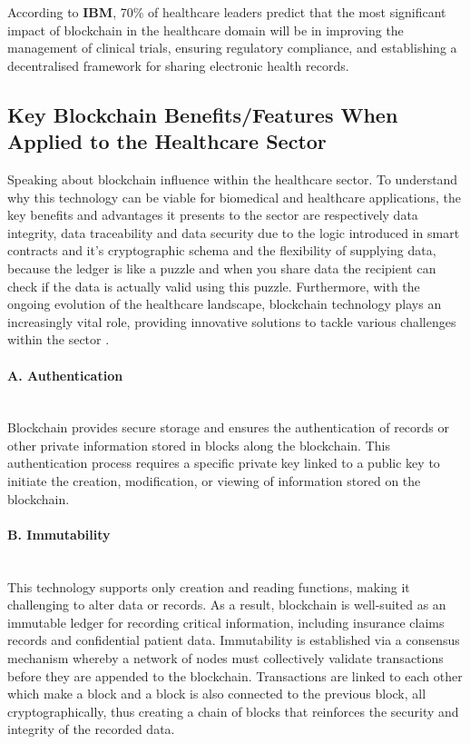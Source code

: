 According to \textbf{IBM}, 70\% of healthcare leaders predict that the most significant impact of blockchain in the healthcare domain will be in improving the management of clinical trials, ensuring regulatory compliance, and establishing a decentralised framework for sharing electronic health records.

\subsection{Key Blockchain Benefits/Features When Applied to the Healthcare Sector}
Speaking about blockchain influence within the healthcare sector. To understand why this technology can be viable for biomedical and healthcare applications, the key benefits and advantages it presents to the sector are respectively data integrity, data traceability and data security due to the logic introduced in smart contracts and it's cryptographic schema and the flexibility of supplying data, because the ledger is like a puzzle and when you share data the recipient can check if the data is actually valid using this puzzle. Furthermore, with the ongoing evolution of the healthcare landscape, blockchain technology plays an increasingly vital role, providing innovative solutions to tackle various challenges within the sector \cite{blockchain-distributed-ledger-biomedical} \cite{blockchain-research-challenges}.

\paragraph{A. Authentication} \mbox{}\\
Blockchain provides secure storage and ensures the authentication of records or other private information stored in blocks along the blockchain. This authentication process requires a specific private key linked to a public key to initiate the creation, modification, or viewing of information stored on the blockchain.

\paragraph{B. Immutability} \mbox{}\\
This technology supports only creation and reading functions, making it challenging to alter data or records. As a result, blockchain is well-suited as an immutable ledger for recording critical information, including insurance claims records and confidential patient data. Immutability is established via a consensus mechanism whereby a network of nodes must collectively validate transactions before they are appended to the blockchain. Transactions are linked to each other which make a block and a block is also connected to the previous block, all cryptographically, thus creating a chain of blocks that reinforces the security and integrity of the recorded data.

